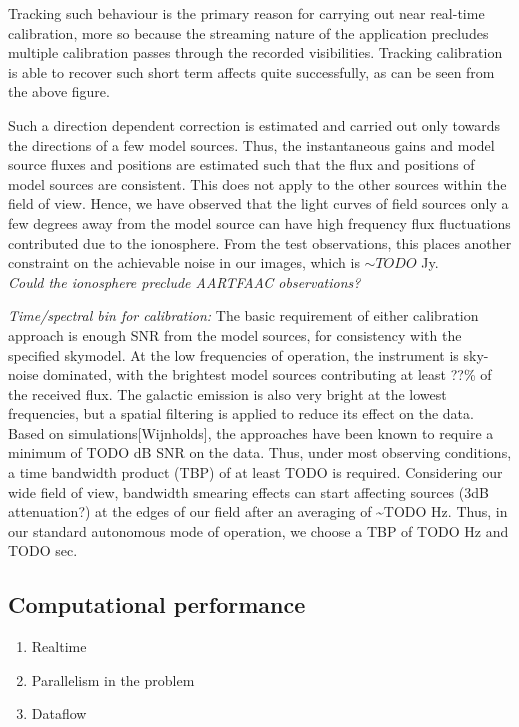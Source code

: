 \documentclass{aa}
\begin{document}
Tracking such behaviour is the primary reason for carrying out near
real-time calibration, more so because the streaming nature of the
application precludes multiple calibration passes through the recorded
visibilities. Tracking calibration is able to recover such short term
affects quite successfully, as can be seen from the above figure.

Such a direction dependent correction is estimated and carried out
only towards the directions of a few model sources. Thus, the instantaneous
gains and model source fluxes and positions are estimated such that
the flux and positions of model sources are consistent. This does
not apply to the other sources within the field of view. Hence, we
have observed that the light curves of field sources only a few degrees
away from the model source can have high frequency flux fluctuations
contributed due to the ionosphere. From the test observations, this
places another constraint on the achievable noise in our images, which
is $\sim TODO$ Jy.\\
\emph{ Could the ionosphere preclude AARTFAAC observations?}

\emph{Time/spectral bin for calibration: }The basic requirement of
either calibration approach is enough SNR from the model sources,
for consistency with the specified skymodel. At the low frequencies
of operation, the instrument is sky-noise dominated, with the brightest
model sources contributing at least ??\% of the received flux. The
galactic emission is also very bright at the lowest frequencies, but
a spatial filtering is applied to reduce its effect on the data. Based
on simulations{[}Wijnholds{]}, the approaches have been known to require
a minimum of TODO dB SNR on the data. Thus, under most observing conditions,
a time bandwidth product (TBP) of at least TODO is required. Considering
our wide field of view, bandwidth smearing effects can start affecting
sources (3dB attenuation?) at the edges of our field after an averaging
of \textasciitilde{}TODO Hz. Thus, in our standard autonomous mode
of operation, we choose a TBP of TODO Hz and TODO sec.


\subsection{\label{sub:Computational-performance}Computational performance}
\begin{enumerate}
\item{Realtime}
\item{Parallelism in the problem}
\item{Dataflow}
\end{enumerate}
\end{document}
